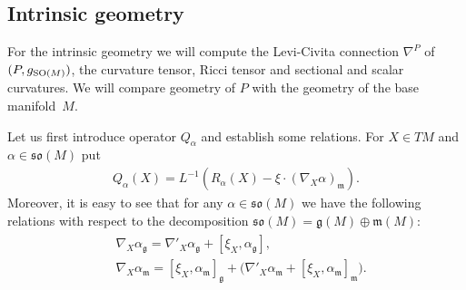 \documentclass[10pt,a4paper]{amsart}
\numberwithin{equation}{section}
\begin{document}
\subsection{Intrinsic geometry}

For the intrinsic geometry we will compute the Levi-Civita connection $\nabla^P$ of $(P,g_{{\rm SO}(M)})$, the curvature tensor, Ricci tensor and sectional and scalar curvatures. We will compare geometry of $P$ with the geometry of the base manifold~$M$.

Let us f\/irst introduce operator $Q_{\alpha}$ and establish some relations. For $X\in TM$ and $\alpha\in\mathfrak{so}(M)$ put
\begin{gather*}
Q_{\alpha}(X)=L^{-1}(R_{\alpha}(X)-\xi\cdot(\nabla_X\alpha)_{\mathfrak{m}}).
\end{gather*}
Moreover, it is easy to see that for any $\alpha\in\mathfrak{so}(M)$ we have the following relations with respect to the decomposition $\mathfrak{so}(M)=\mathfrak{g}(M)\oplus\mathfrak{m}(M)$:
\begin{gather}\label{eq:basicrelations}
\begin{split}
&\nabla_X\alpha_{\mathfrak{g}} =\nabla'_X\alpha_{\mathfrak{g}}+[\xi_X,\alpha_{\mathfrak{g}}],\\
&\nabla_X\alpha_{\mathfrak{m}} =[\xi_X,\alpha_{\mathfrak{m}}]_{\mathfrak{g}}+\big( \nabla'_X\alpha_{\mathfrak{m}}+[\xi_X,\alpha_{\mathfrak{m}}]_{\mathfrak{m}} \big).
\end{split}
\end{gather}
\end{document}
